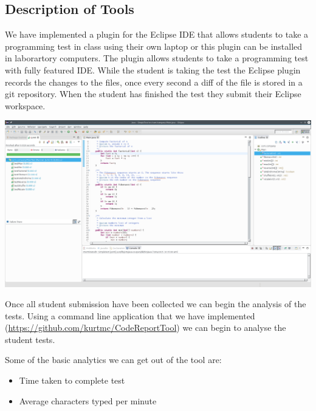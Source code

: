 \documentclass[a1,portrait]{a0poster}
\begin{document}
\begin{multicols}{2}

\color{DarkSlateGray} %

\section*{Description of Tools}

We have implemented a plugin for the Eclipse IDE that allows students to take a
programming test in class using their own laptop or this plugin can be
installed in laborartory computers. The plugin allows students to take a
programming test with fully featured IDE. While the student is taking the test
the Eclipse plugin records the changes to the files, once every second a diff
of the file is stored in a git repository. When the student has finished the
test they submit their Eclipse workspace.

\begin{center}\vspace{1cm}
\includegraphics[width=0.8\linewidth]{eclipse}
\end{center}\vspace{1cm}

Once all student submission have been collected we can begin the analysis of
the tests. Using a command line application that we have implemented
(\url{https://github.com/kurtmc/CodeReportTool}) we can begin to analyse the
student tests.

Some of the basic analytics we can get out of the tool are:
\begin{itemize}
	\item Time taken to complete test
	\item Average characters typed per minute
\end{itemize}


\end{multicols}
\end{document}
